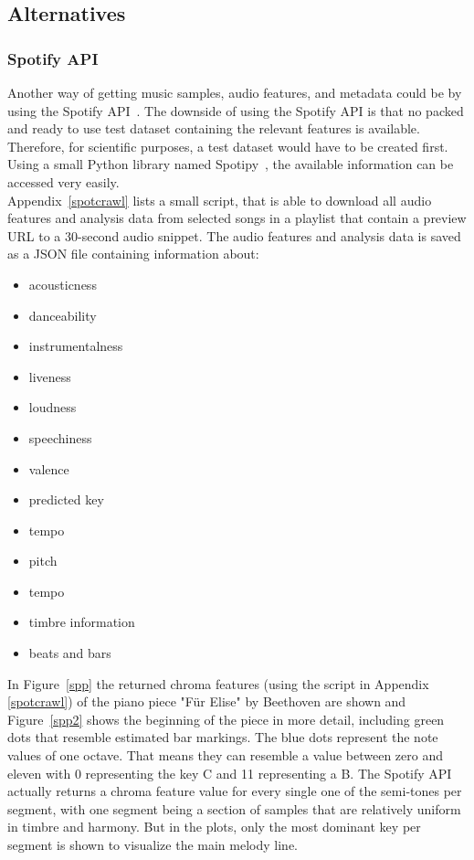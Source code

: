 \subsection{Alternatives}

\subsubsection{Spotify API}\label{spotipy}

Another way of getting music samples, audio features, and metadata could be by using the Spotify API~\cite{spotifyapi1}.
The downside of using the Spotify API is that no packed and ready to use test dataset containing the relevant features is available. Therefore, for scientific purposes, a test dataset would have to be created first. Using a small Python library named Spotipy~\cite{spotipy1}, the available information can be accessed very easily.\\
Appendix~\ref{spotcrawl} lists a small script, that is able to download all audio features and analysis data from selected songs in a playlist that contain a preview URL to a 30-second audio snippet. The audio features and analysis data is saved as a JSON file containing information about:
\begin{itemize}
	\setlength\itemsep{-0.5em}
	\item acousticness
	\item danceability
	\item instrumentalness
	\item liveness
	\item loudness
	\item speechiness
	\item valence
	\item predicted key
	\item tempo 
	\item pitch 
	\item tempo 
	\item timbre information 
	\item beats and bars 
\end{itemize}
\noindent In Figure~\ref{spp} the returned chroma features (using the script in Appendix \ref{spotcrawl}) of the piano piece "Für Elise" by Beethoven are shown and Figure~\ref{spp2} shows the beginning of the piece in more detail, including green dots that resemble estimated bar markings. The blue dots represent the note values of one octave. That means they can resemble a value between zero and eleven with 0 representing the key C and 11 representing a B. The Spotify API actually returns a chroma feature value for every single one of the semi-tones per segment, with one segment being a section of samples that are relatively uniform in timbre and harmony. But in the plots, only the most dominant key per segment is shown to visualize the main melody line.
